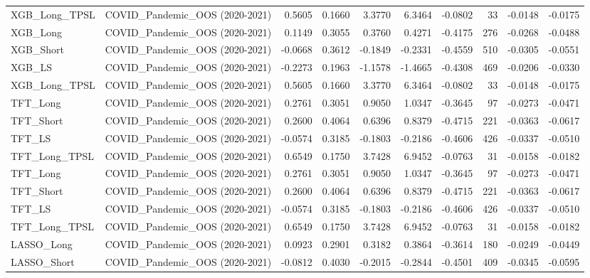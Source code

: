 \begin{tabular}{llrrrrrrrr}
\cline{1-10}
XGB\_Long\_TPSL & COVID\_Pandemic\_OOS (2020-2021) & 0.5605 & 0.1660 & 3.3770 & 6.3464 & -0.0802 & 33 & -0.0148 & -0.0175 \\
\cline{1-10}
XGB\_Long & COVID\_Pandemic\_OOS (2020-2021) & 0.1149 & 0.3055 & 0.3760 & 0.4271 & -0.4175 & 276 & -0.0268 & -0.0488 \\
\cline{1-10}
XGB\_Short & COVID\_Pandemic\_OOS (2020-2021) & -0.0668 & 0.3612 & -0.1849 & -0.2331 & -0.4559 & 510 & -0.0305 & -0.0551 \\
\cline{1-10}
XGB\_LS & COVID\_Pandemic\_OOS (2020-2021) & -0.2273 & 0.1963 & -1.1578 & -1.4665 & -0.4308 & 469 & -0.0206 & -0.0330 \\
\cline{1-10}
XGB\_Long\_TPSL & COVID\_Pandemic\_OOS (2020-2021) & 0.5605 & 0.1660 & 3.3770 & 6.3464 & -0.0802 & 33 & -0.0148 & -0.0175 \\
\cline{1-10}
TFT\_Long & COVID\_Pandemic\_OOS (2020-2021) & 0.2761 & 0.3051 & 0.9050 & 1.0347 & -0.3645 & 97 & -0.0273 & -0.0471 \\
\cline{1-10}
TFT\_Short & COVID\_Pandemic\_OOS (2020-2021) & 0.2600 & 0.4064 & 0.6396 & 0.8379 & -0.4715 & 221 & -0.0363 & -0.0617 \\
\cline{1-10}
TFT\_LS & COVID\_Pandemic\_OOS (2020-2021) & -0.0574 & 0.3185 & -0.1803 & -0.2186 & -0.4606 & 426 & -0.0337 & -0.0510 \\
\cline{1-10}
TFT\_Long\_TPSL & COVID\_Pandemic\_OOS (2020-2021) & 0.6549 & 0.1750 & 3.7428 & 6.9452 & -0.0763 & 31 & -0.0158 & -0.0182 \\
\cline{1-10}
TFT\_Long & COVID\_Pandemic\_OOS (2020-2021) & 0.2761 & 0.3051 & 0.9050 & 1.0347 & -0.3645 & 97 & -0.0273 & -0.0471 \\
\cline{1-10}
TFT\_Short & COVID\_Pandemic\_OOS (2020-2021) & 0.2600 & 0.4064 & 0.6396 & 0.8379 & -0.4715 & 221 & -0.0363 & -0.0617 \\
\cline{1-10}
TFT\_LS & COVID\_Pandemic\_OOS (2020-2021) & -0.0574 & 0.3185 & -0.1803 & -0.2186 & -0.4606 & 426 & -0.0337 & -0.0510 \\
\cline{1-10}
TFT\_Long\_TPSL & COVID\_Pandemic\_OOS (2020-2021) & 0.6549 & 0.1750 & 3.7428 & 6.9452 & -0.0763 & 31 & -0.0158 & -0.0182 \\
\cline{1-10}
LASSO\_Long & COVID\_Pandemic\_OOS (2020-2021) & 0.0923 & 0.2901 & 0.3182 & 0.3864 & -0.3614 & 180 & -0.0249 & -0.0449 \\
\cline{1-10}
LASSO\_Short & COVID\_Pandemic\_OOS (2020-2021) & -0.0812 & 0.4030 & -0.2015 & -0.2844 & -0.4501 & 409 & -0.0345 & -0.0595 \\

\end{tabular}
